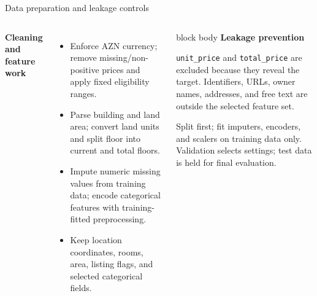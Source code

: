 \documentclass[aspectratio=169,10pt]{beamer}
\begin{document}
\begin{frame}{Data preparation and leakage controls}
  \begin{columns}[T,onlytextwidth]
      \textbf{Cleaning and feature work}
      \begin{itemize}
        \item Enforce AZN currency; remove missing/non-positive prices and
          apply fixed eligibility ranges.
        \item Parse building and land area; convert land units and split floor
          into current and total floors.
        \item Impute numeric missing values from training data; encode
          categorical features with training-fitted preprocessing.
        \item Keep location coordinates, rooms, area, listing flags, and
          selected categorical fields.
      \end{itemize}
      \begin{beamercolorbox}[wd=\linewidth,sep=0.8em,rounded=true]{block body}
        \textbf{Leakage prevention}\par\vspace{0.15cm}
        \texttt{unit\_price} and \texttt{total\_price} are excluded because
        they reveal the target. Identifiers, URLs, owner names, addresses, and
        free text are outside the selected feature set.\par\vspace{0.3cm}
        Split first; fit imputers, encoders, and scalers on training data only.
        Validation selects settings; test data is held for final evaluation.
      \end{beamercolorbox}
  \end{columns}
\end{frame}
\end{document}
